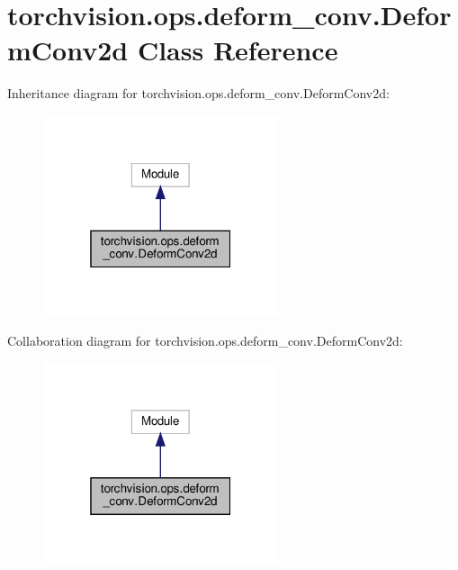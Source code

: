 \hypertarget{classtorchvision_1_1ops_1_1deform__conv_1_1DeformConv2d}{}\section{torchvision.\+ops.\+deform\+\_\+conv.\+Deform\+Conv2d Class Reference}
\label{classtorchvision_1_1ops_1_1deform__conv_1_1DeformConv2d}


Inheritance diagram for torchvision.\+ops.\+deform\+\_\+conv.\+Deform\+Conv2d\+:
\nopagebreak
\begin{figure}[H]
\begin{center}
\leavevmode
\includegraphics[width=196pt]{classtorchvision_1_1ops_1_1deform__conv_1_1DeformConv2d__inherit__graph}
\end{center}
\end{figure}


Collaboration diagram for torchvision.\+ops.\+deform\+\_\+conv.\+Deform\+Conv2d\+:
\nopagebreak
\begin{figure}[H]
\begin{center}
\leavevmode
\includegraphics[width=196pt]{classtorchvision_1_1ops_1_1deform__conv_1_1DeformConv2d__coll__graph}
\end{center}
\end{figure}
